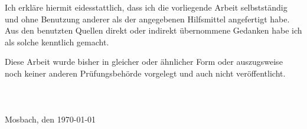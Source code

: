 Ich erkläre hiermit eidesstattlich, dass ich die vorliegende Arbeit selbstständig und ohne Benutzung anderer als der angegebenen Hilfsmittel angefertigt habe.
Aus den benutzten Quellen direkt oder indirekt übernommene Gedanken habe ich als solche kenntlich gemacht.

Diese Arbeit wurde bisher in gleicher oder ähnlicher Form oder auszugsweise noch keiner anderen Prüfungsbehörde vorgelegt und auch nicht veröffentlicht.
\\
\vspace{2cm}
\\
\unterschrift\\
\noindent\verfasser
\\
\noindent Mosbach, den \today